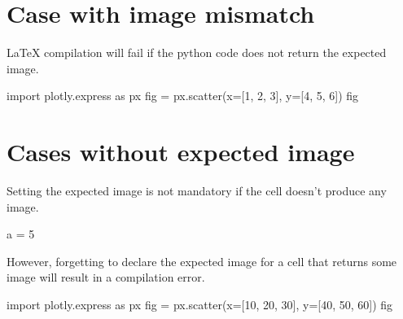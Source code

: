 \documentclass{book}
\begin{document}
\chapter{Case with image mismatch}

LaTeX compilation will fail if the python code does not return the expected image.

\begin{pycell}
import plotly.express as px
fig = px.scatter(x=[1, 2, 3], y=[4, 5, 6])
fig
\end{pycell}

\chapter{Cases without expected image}

Setting the expected image is not mandatory if the cell doesn't produce any image.

\begin{pycell}
a = 5
\end{pycell}

However, forgetting to declare the expected image for a cell that returns some image will result in a compilation error.
\begin{pycell}
import plotly.express as px
fig = px.scatter(x=[10, 20, 30], y=[40, 50, 60])
fig
\end{pycell}

\ifPythonTeXLoaded
\else
\fi
\end{document}
